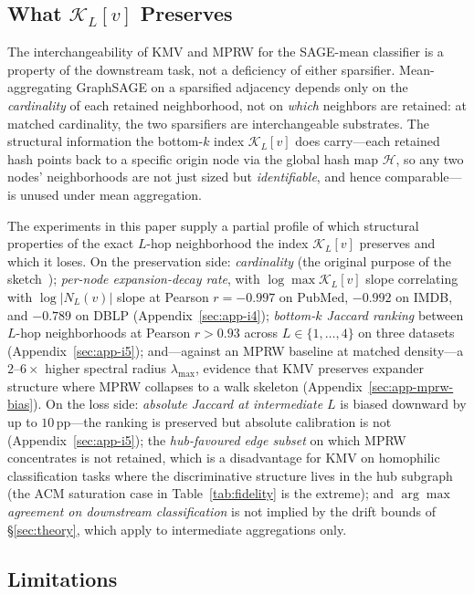 \documentclass[sigconf]{acmart}
\begin{document}
\subsection{What $\mathcal{K}_L[v]$ Preserves}
\label{sec:discussion-preservation}

The interchangeability of KMV and MPRW for the SAGE-mean classifier is a property of the downstream task, not a deficiency of either sparsifier.
Mean-aggregating GraphSAGE on a sparsified adjacency depends only on the \emph{cardinality} of each retained neighborhood, not on \emph{which} neighbors are retained: at matched cardinality, the two sparsifiers are interchangeable substrates.
The structural information the bottom-$k$ index $\mathcal{K}_L[v]$ does carry---each retained hash points back to a specific origin node via the global hash map $\mathcal{H}$, so any two nodes' neighborhoods are not just sized but \emph{identifiable}, and hence comparable---is unused under mean aggregation.

The experiments in this paper supply a partial profile of which structural properties of the exact $L$-hop neighborhood the index $\mathcal{K}_L[v]$ preserves and which it loses.
On the preservation side: \emph{cardinality} (the original purpose of the sketch~\cite{berahmand2024kmv}); \emph{per-node expansion-decay rate}, with $\log\max\mathcal{K}_L[v]$ slope correlating with $\log|N_L(v)|$ slope at Pearson $r{=}-0.997$ on PubMed, $-0.992$ on IMDB, and $-0.789$ on DBLP (Appendix~\ref{sec:app-i4}); \emph{bottom-$k$ Jaccard ranking} between $L$-hop neighborhoods at Pearson $r{>}0.93$ across $L\in\{1,\ldots,4\}$ on three datasets (Appendix~\ref{sec:app-i5}); and---against an MPRW baseline at matched density---a $2$--$6\times$ higher spectral radius $\lambda_{\max}$, evidence that KMV preserves expander structure where MPRW collapses to a walk skeleton (Appendix~\ref{sec:app-mprw-bias}).
On the loss side: \emph{absolute Jaccard at intermediate $L$} is biased downward by up to $10$\,pp---the ranking is preserved but absolute calibration is not (Appendix~\ref{sec:app-i5}); the \emph{hub-favoured edge subset} on which MPRW concentrates is not retained, which is a disadvantage for KMV on homophilic classification tasks where the discriminative structure lives in the hub subgraph (the ACM saturation case in Table~\ref{tab:fidelity} is the extreme); and \emph{$\arg\max$ agreement on downstream classification} is not implied by the drift bounds of \S\ref{sec:theory}, which apply to intermediate aggregations only.

\subsection{Limitations}
\label{sec:limitations}
\end{document}
